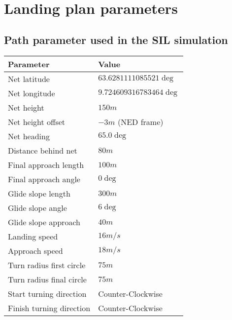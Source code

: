 \chapter{Landing plan parameters}

\section{Path parameter used in the SIL simulation}\label{AP:SpecSIL}

\begin{table}
\centering
\begin{tabular}{| p{4cm} | p{4cm} |}
\hline
\textbf{Parameter}			& \textbf{Value}			\\ \hline
Net latitude				& $63.6281111085521 \deg$ 	\\ \hline
Net longitude				& $9.724609316783464 \deg$ 	\\ \hline
Net height					& $150 m$					\\ \hline
Net height offset			& $-3 m$ (NED frame)		\\ \hline
Net heading					& $65.0 \deg$				\\ \hline
Distance behind net			& $80 m$					\\ \hline
Final approach length		& $100 m$					\\ \hline
Final approach angle		& $0 \deg$					\\ \hline
Glide slope length			& $300 m $					\\ \hline
Glide slope angle			& $6 \deg$					\\ \hline
Glide slope approach		& $40 m$					\\ \hline
Landing speed				& $16 m/s$					\\ \hline
Approach speed				& $18 m/s$					\\ \hline
Turn radius first circle	& $75 m$					\\ \hline
Turn radius final circle	& $75 m$					\\ \hline
Start turning direction		& Counter-Clockwise			\\ \hline
Finish turning direction	& Counter-Clockwise			\\ \hline
\end{tabular}
\end{table}

